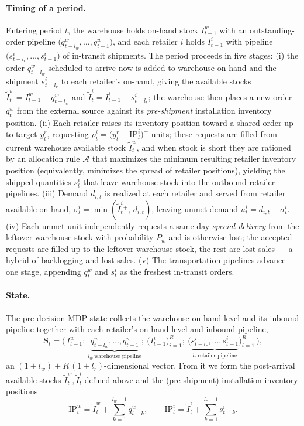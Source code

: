 \documentclass[11pt]{article}
\begin{document}
\paragraph{Timing of a period.}
Entering period $t$, the warehouse holds on-hand stock $I^w_{t-1}$ with an outstanding-order
pipeline $\big(q^w_{t-l_w},\dots,q^w_{t-1}\big)$, and each retailer $i$ holds $I^i_{t-1}$ with
pipeline $\big(s^i_{t-l_r},\dots,s^i_{t-1}\big)$ of in-transit shipments. The period proceeds in
five stages: (i) the order $q^w_{t-l_w}$ scheduled to arrive now is added to warehouse on-hand and
the shipment $s^i_{t-l_r}$ to each retailer's on-hand, giving the available stocks
$\widetilde I^w_t = I^w_{t-1}+q^w_{t-l_w}$ and $\widetilde I^i_t = I^i_{t-1}+s^i_{t-l_r}$; the
warehouse then places a new order $q^w_t$ from the external source against its
\emph{pre-shipment} installation inventory position. (ii) Each retailer raises its inventory
position toward a shared order-up-to target $y^r_t$, requesting
$\rho^i_t=\big(y^r_t-\mathrm{IP}^i_t\big)^+$ units; these requests are filled from current
warehouse available stock $\widetilde I^w_t$, and when stock is short they are rationed by an
allocation rule $\mathcal A$ that maximizes the minimum resulting retailer inventory position
(equivalently, minimizes the spread of retailer positions), yielding the shipped quantities
$s^i_t$ that leave warehouse stock into the outbound retailer pipelines. (iii) Demand $d_{i,t}$ is
realized at each retailer and served from retailer available on-hand, $\sigma^i_t=\min(\widetilde
I^i_t{}^+,\,d_{i,t})$, leaving unmet demand $u^i_t=d_{i,t}-\sigma^i_t$. (iv) Each unmet unit
independently requests a same-day \emph{special delivery} from the leftover warehouse stock with
probability $P_w$ and is otherwise lost; the accepted requests are filled up to the leftover
warehouse stock, the rest are lost sales --- a hybrid of backlogging and lost sales. (v) The
transportation pipelines advance one stage, appending $q^w_t$ and $s^i_t$ as the freshest
in-transit orders.

\paragraph{State.}
The pre-decision MDP state collects the warehouse on-hand level and its inbound pipeline together
with each retailer's on-hand level and inbound pipeline,
\begin{equation*}
  \mathbf S_t = \Big(\, I^w_{t-1};\ \underbrace{q^w_{t-l_w},\dots,q^w_{t-1}}_{l_w\ \text{warehouse pipeline}};\
  \big(I^i_{t-1}\big)_{i=1}^{R};\ \big(\underbrace{s^i_{t-l_r},\dots,s^i_{t-1}}_{l_r\ \text{retailer pipeline}}\big)_{i=1}^{R} \,\Big),
\end{equation*}
an $(1+l_w)+R\,(1+l_r)$-dimensional vector. From it we form the post-arrival available stocks
$\widetilde I^w_t,\widetilde I^i_t$ defined above and the (pre-shipment) installation inventory
positions
\begin{equation*}
  \mathrm{IP}^w_t = \widetilde I^w_t + \sum_{k=1}^{l_w-1} q^w_{t-k},
  \qquad
  \mathrm{IP}^i_t = \widetilde I^i_t + \sum_{k=1}^{l_r-1} s^i_{t-k}.
\end{equation*}
\end{document}
